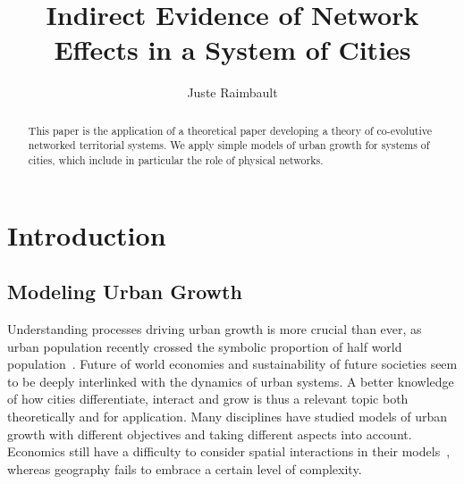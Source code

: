\documentclass[Royal,sageh,times]{sagej}
\begin{document}

\title{Indirect Evidence of Network Effects in a System of Cities}

\author{Juste Raimbault}




\begin{abstract}
This paper is the application of a theoretical paper developing a theory of co-evolutive networked territorial systems. We apply simple models of urban growth for systems of cities, which include in particular the role of physical networks.
\end{abstract}


\maketitle






\section{Introduction}

\subsection{Modeling Urban Growth}

Understanding processes driving urban growth is more crucial than ever, as urban population recently crossed the symbolic proportion of half world population~\cite{}.%
 Future of world economies and sustainability of future societies seem to be deeply interlinked with the dynamics of urban systems.%
 A better knowledge of how cities differentiate, interact and grow is thus a relevant topic both theoretically and for application. Many disciplines have studied models of urban growth with different objectives and taking different aspects into account. Economics still have a difficulty to consider spatial interactions in their models~\cite{krugman1998space}, whereas geography fails to embrace a certain level of complexity.
\end{document}
